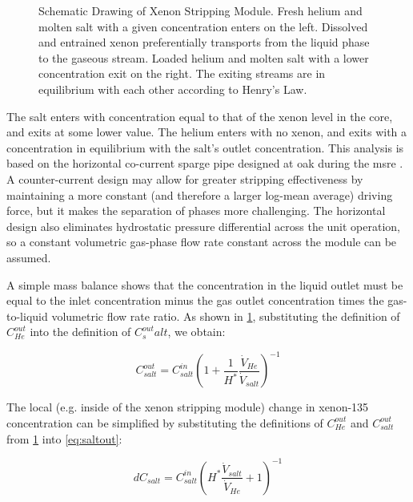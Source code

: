\begin{figure}[ht!]\centering
    \resizebox*{0.75\textwidth}{!}{}
     \caption[Schematic Drawing of Xenon Stripping Module]{Schematic Drawing of Xenon Stripping Module. Fresh helium and molten salt with a given \Xe concentration enters on the left. Dissolved and entrained xenon preferentially transports from the liquid phase to the gaseous stream. Loaded helium and molten salt with a lower \Xe concentration exit on the right. The exiting streams are in equilibrium with each other according to Henry's Law.} 
    \label{fig:strip}
\end{figure}

The salt enters with \Xe concentration equal to that of the xenon level in the core, and exits at some lower value. The helium enters with no xenon, and exits with a \Xe concentration in equilibrium with the salt's outlet concentration. This analysis is based on the horizontal co-current sparge pipe designed at \acs{oak} during the \acf{msre} \cite{ORNL-masstransport}. A counter-current design may allow for greater stripping effectiveness by maintaining a more constant (and therefore a larger log-mean average) driving force, but it makes the separation of phases more challenging. The horizontal design also eliminates hydrostatic pressure differential across the unit operation, so a constant volumetric gas-phase flow rate constant across the module can be assumed.


A simple mass balance shows that the concentration in the liquid outlet must be equal to the inlet concentration minus the gas outlet concentration times the gas-to-liquid volumetric flow rate ratio. As shown in \cref{fig:strip}, substituting the definition of $C^{out}_{He}$ into the definition of $C^{out}_salt$, we obtain:

\begin{equation} \label{eq:saltout}
    C_{salt}^{out}=C_{salt}^{in}\left( 1+\frac{1}{H^*}\frac{\dot{V}_{He}}{\dot{V}_{salt}}  \right)^{-1}
\end{equation}

The local (e.g. inside of the xenon stripping module) change in xenon-135 concentration can be simplified by substituting the definitions of $C_{He}^{out}$ and $C_{salt}^{out}$ from \cref{fig:strip} into \ref{eq:saltout}:  


\begin{equation} \label{eq:local_diff}
    dC_{salt} = {C_{salt}^{in}}\left( H^*\frac{\dot{V}_{salt}}{\dot{V}_{He}}+1 \right)^{-1}
\end{equation}

